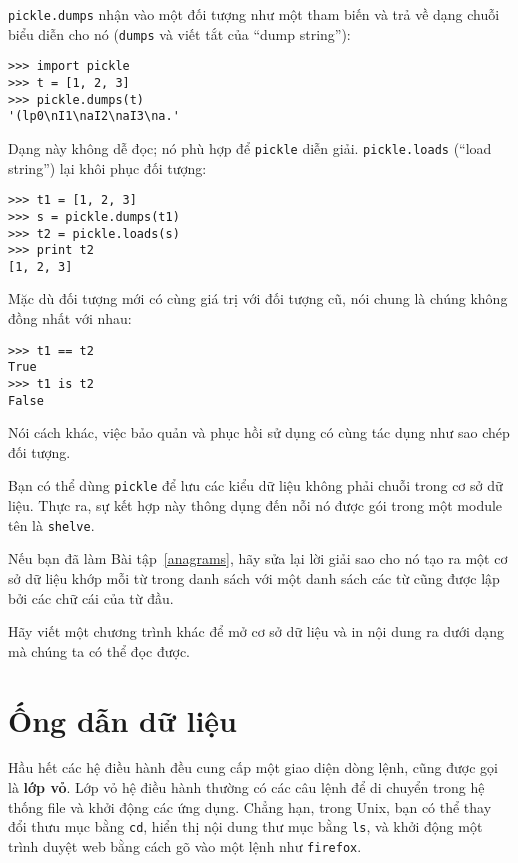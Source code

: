 \documentclass[11pt]{book}
\begin{document}
{\tt pickle.dumps} nhận vào một đối tượng như một tham biến và
trả về dạng chuỗi biểu diễn cho nó ({\tt dumps} và viết tắt của ``dump string''):

\beforeverb
\begin{verbatim}
>>> import pickle
>>> t = [1, 2, 3]
>>> pickle.dumps(t)
'(lp0\nI1\naI2\naI3\na.'
\end{verbatim}
\afterverb
%
Dạng này không dễ đọc; nó phù hợp để {\tt pickle} diễn giải.
{\tt pickle.loads} (``load string'') lại khôi phục đối tượng:

\beforeverb
\begin{verbatim}
>>> t1 = [1, 2, 3]
>>> s = pickle.dumps(t1)
>>> t2 = pickle.loads(s)
>>> print t2
[1, 2, 3]
\end{verbatim}
\afterverb
%
Mặc dù đối tượng mới có cùng giá trị với đối tượng cũ, nói chung
là chúng không đồng nhất với nhau:

\beforeverb
\begin{verbatim}
>>> t1 == t2
True
>>> t1 is t2
False
\end{verbatim}
\afterverb
%
Nói cách khác, việc bảo quản và phục hồi sử dụng có cùng tác dụng
như sao chép đối tượng.

Bạn có thể dùng {\tt pickle} để lưu các kiểu dữ liệu không phải chuỗi
trong cơ sở dữ liệu. Thực ra, sự kết hợp này thông dụng đến nỗi
nó được gói trong một module tên là {\tt shelve}.  



\begin{ex}


Nếu bạn đã làm Bài tập~\ref{anagrams}, hãy sửa lại lời giải sao cho
nó tạo ra một cơ sở dữ liệu khớp mỗi từ trong danh sách với một
danh sách các từ cũng được lập bởi các chữ cái của từ đầu.

Hãy viết một chương trình khác để mở cơ sở dữ liệu và in nội dung
ra dưới dạng mà chúng ta có thể đọc được.
\end{ex}


\section{Ống dẫn dữ liệu}


Hầu hết các hệ điều hành đều cung cấp một giao diện dòng lệnh,
cũng được gọi là {\bf lớp vỏ}. Lớp vỏ hệ điều hành thường có các câu lệnh
để di chuyển trong hệ thống file và khởi động các ứng dụng. Chẳng hạn,
trong Unix, bạn có thể thay đổi thưu mục bằng {\tt cd},
hiển thị nội dung thư mục bằng {\tt ls}, và khởi động một
trình duyệt web bằng cách gõ vào một lệnh như {\tt firefox}.
\end{document}

